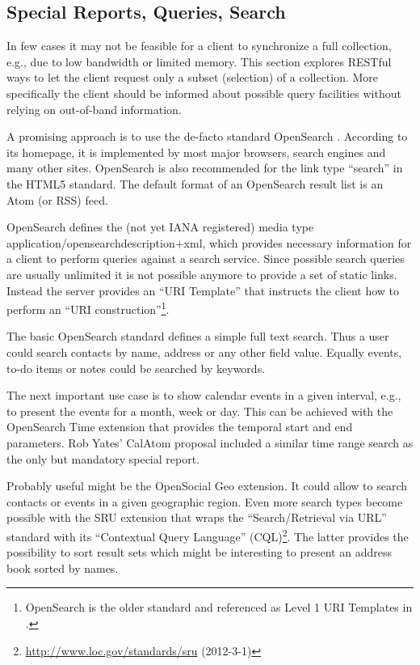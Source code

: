 \documentclass[11pt,a4paper,headsepline,twoside]{scrartcl}		%
\newcommand{\citeurl}[2]{\url{#1} (#2)}
\begin{document}
\subsection{Special Reports, Queries, Search}
\label{sec:spec-reports-search}

In few cases it may not be feasible for a client to synchronize a full
collection, e.g., due to low bandwidth or limited memory. This section explores
RESTful ways to let the client request only a subset (selection) of a
collection. More specifically the client should be informed about possible query
facilities without relying on out-of-band information.

A promising approach is to use the de-facto standard
OpenSearch \cite{Clinton}. According to its homepage, it is implemented by most
major browsers, search engines and many other sites. OpenSearch is also
recommended for the link type ``search'' in the HTML5
standard\cite[sec. 4.12.4.12]{Hickson2011a}. The default format of an OpenSearch
result list is an Atom (or RSS) feed.

OpenSearch defines the (not yet IANA registered) media type
application/opensearchdescription+xml, which provides necessary information for
a client to perform queries against a search service. Since possible search
queries are usually unlimited it is not possible anymore to provide a set of
static links. Instead the server provides an ``URI Template'' \cite{RFC6570}
that instructs the client how to perform an ``URI
construction''\footnote{OpenSearch is the older standard and referenced as Level
  1 URI Templates in \cite{RFC6570}.}.

The basic OpenSearch standard defines a simple full text search. Thus a user
could search contacts by name, address or any other field value. Equally events,
to-do items or notes could be searched by keywords.

The next important use case is to show calendar events in a given interval,
e.g., to present the events for a month, week or day. This can be achieved with
the OpenSearch Time extension that provides the temporal start and end
parameters. Rob Yates' CalAtom \cite{draft-yates-atompub-calatom-00.txt} proposal
included a similar time range search as the only but mandatory special report.

Probably useful might be the OpenSocial Geo extension. It could allow to search
contacts or events in a given geographic region. Even more search types become
possible with the SRU extension that wraps the ``Search/Retrieval via URL''
standard with its ``Contextual Query Language''
(CQL)\footnote{\citeurl{http://www.loc.gov/standards/sru}{2012-3-1}}. The latter
provides the possibility to sort result sets which might be interesting to
present an address book sorted by names.
\end{document}
